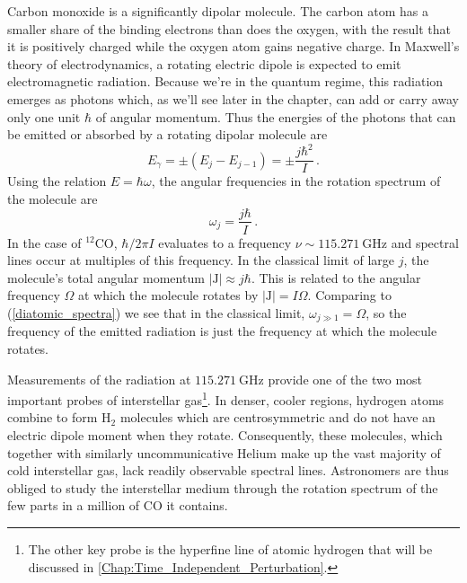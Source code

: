 \documentclass{article}
\theoremstyle{plain}\theoremheaderfont{\normalfont\itshape}\theorembodyfont{\rmfamily}\theoremseparator{.}\newtheorem*{rem}{Remark}\newtheorem*{ex}{Example}\newtheorem*{proof}{Proof}\newtheorem*{altp}{Alternative proof}
\theoremstyle{plain}\theoremheaderfont{\normalfont\bfseries}\theorembodyfont{\rmfamily}\theoremseparator{.}\newtheorem{thm}{Theorem}[section]\newtheorem{lem}[thm]{Lemma}\newtheorem{prop}[thm]{Proposition}\newtheorem*{cor}{Corollary}\newtheorem{defn}[thm]{Definition}\newtheorem{clm}[thm]{Claim}\newtheorem{clminproof}{Claim}
\theoremstyle{break}\theoremheaderfont{\normalfont\itshape}\theorembodyfont{\rmfamily}\theoremseparator{.\medskip}\newtheorem*{proofskip}{Proof}\newtheorem*{exs}{Examples}\newtheorem*{rems}{Remarks}
\theoremstyle{break}\theoremheaderfont{\normalfont\bfseries}\theorembodyfont{\rmfamily}\theoremseparator{.\medskip}\newtheorem{lemskip}[thm]{Lemma}\newtheorem{defnskip}[thm]{Definition}\newtheorem{propskip}[thm]{Proposition}\newtheorem{thmskip}[thm]{Theorem}
\numberwithin{equation}{section}
\newcommand{\unit}[1]{\ \mathrm{#1}}
\newcommand{\vb}[1]{\bm{\mathrm{#1}}}
\newcommand{\abs}[1]{\left| #1 \right|}
\begin{document}
    Carbon monoxide is a significantly dipolar molecule. The carbon atom has a smaller share of the binding electrons than does the oxygen, with the result that it is positively charged while the oxygen atom gains negative charge. In Maxwell's theory of electrodynamics, a rotating electric dipole is expected to emit electromagnetic radiation. Because we're in the quantum regime, this radiation emerges as photons which, as we'll see later in the chapter, can add or carry away only one unit \(\hbar\) of angular momentum. Thus the energies of the photons that can be emitted or absorbed by a rotating dipolar molecule are
    \begin{equation}
        E_\gamma=\pm(E_j-E_{j-1})=\pm\frac{j\hbar^2}{I}\,.
    \end{equation}
    Using the relation \(E=\hbar\omega\), the angular frequencies in the rotation spectrum of the molecule are
    \begin{equation}\label{diatomic_spectra}
        \omega_j=\frac{j\hbar}{I}\,.
    \end{equation}
    In the case of \(\mathrm{^{12}CO}\), \(\hbar/2\pi I\) evaluates to a frequency \(\nu\sim 115.271\unit{GHz}\) and spectral lines occur at multiples of this frequency. In the classical limit of large \(j\), the molecule's total angular momentum \(\abs{\vb{J}}\approx j\hbar\). This is related to the angular frequency \(\Omega\) at which the molecule rotates by \(\abs{\vb{J}}=I\Omega\). Comparing to (\ref{diatomic_spectra}) we see that in the classical limit, \(\omega_{j\gg 1}=\Omega\), so the frequency of the emitted radiation is just the frequency at which the molecule rotates.

    Measurements of the radiation at \(115.271\unit{GHz}\) provide one of the two most important probes of interstellar gas\footnote{The other key probe is the hyperfine line of atomic hydrogen that will be discussed in \cref{Chap:Time_Independent_Perturbation}.}. In denser, cooler regions, hydrogen atoms combine to form \(\mathrm{H_2}\) molecules which are centrosymmetric and do not have an electric dipole moment when they rotate. Consequently, these molecules, which together with similarly uncommunicative Helium make up the vast majority of cold interstellar gas, lack readily observable spectral lines. Astronomers are thus obliged to study the interstellar medium through the rotation spectrum of the few parts in a million of \(\mathrm{CO}\) it contains.
\end{document}
